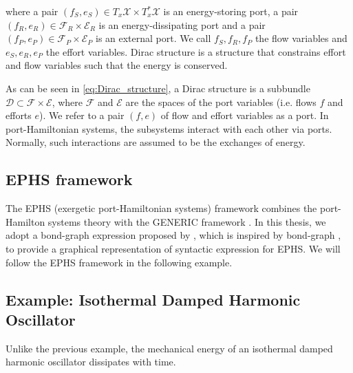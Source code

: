 \documentclass[
	parskip, 			   %
	twoside, 			   %
	DIV=14, 			   %
	BCOR=15.0mm, 		   %
	headsepline, 		   %
	open=right, 		   %
	captions=tableheading, %
	bibliography=totoc,    %
	numbers=noenddot       %
]{scrreprt}
\begin{document}
where a pair $(f_S, e_S) \in T_{x}\mathcal{X} \times T_{x}^{*}\mathcal{X}$ is an energy-storing port, a pair $(f_R, e_R) \in \mathcal{F}_R \times \mathcal{E}_R$ is an energy-dissipating port and a pair $(f_P, e_P) \in \mathcal{F}_P \times \mathcal{E}_P$ is an external port. We call $f_S, f_R, f_P$ the flow variables and $e_S, e_R, e_P$ the effort variables. Dirac structure is a structure that constrains effort and flow variables such that the energy is conserved.

As can be seen in \ref{eq:Dirac_structure}, a Dirac structure is a subbundle $\mathcal{D} \subset \mathcal{F} \times \mathcal{E}$, where $\mathcal{F}$ and $\mathcal{E}$ are the spaces of the port variables (i.e. flows $f$ and efforts $e$). We refer to a pair $(f,e)$ of flow and effort variables as a port. In port-Hamiltonian systems, the subsystems interact with each other via ports. Normally, such interactions are assumed to be the exchanges of energy.

\subsection{EPHS framework}
The EPHS (exergetic port-Hamiltonian systems) framework combines the port-Hamilton systems theory with the GENERIC framework \cite{lohmayer2021exergetic}. In this thesis, we adopt a bond-graph expression proposed by \cite{lohmayer2022ephs}, which is inspired by bond-graph \cite{paynter1961analysis}, to provide a graphical representation of syntactic expression for EPHS. We will follow the EPHS framework in the following example.

\subsection{Example: Isothermal Damped Harmonic Oscillator}
Unlike the previous example, the mechanical energy of an isothermal damped harmonic oscillator dissipates with time.
\end{document}
